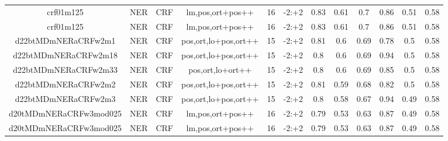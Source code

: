 \documentclass[a4paper]{article}
\begin{document}
\begin{landscape}
\begin{center}
\begin{tabular}{ |c|c|c|c|c|c|c|c|c|c|c|c|}
 	
 		
 		\small{ crf01m125 } & NER & CRF & lm,pos,ort+pos++  &  16 &  -2:+2  &  0.83 & 0.61 & 0.7  &  0.86 & 0.51 & 0.58 \\
 		

 	
 
 	
 		
 		\small{ crf01m125 } & NER & CRF & lm,pos,ort+pos++  &  16 &  -2:+2  &  0.83 & 0.61 & 0.7  &  0.86 & 0.51 & 0.58 \\
 		

 	
 
 	
 		
 		\small{ d22btMDmNERaCRFw2m1 } & NER & CRF & pos,ort,lo+pos,ort++  &  15 &  -2:+2  &  0.81 & 0.6 & 0.69  &  0.78 & 0.5 & 0.58 \\
 		

 	
 
 	
 		
 		\small{ d22btMDmNERaCRFw2m18 } & NER & CRF & pos,ort,lo+pos,ort++  &  15 &  -2:+2  &  0.8 & 0.6 & 0.69  &  0.94 & 0.5 & 0.58 \\
 		

 	
 
 	
 		
 		\small{ d22btMDmNERaCRFw2m33 } & NER & CRF & pos,ort,lo+ort++  &  15 &  -2:+2  &  0.8 & 0.6 & 0.69  &  0.85 & 0.5 & 0.58 \\
 		

 	
 
 	
 		
 		\small{ d22btMDmNERaCRFw2m2 } & NER & CRF & pos,ort,lo+pos,ort++  &  15 &  -2:+2  &  0.81 & 0.59 & 0.68  &  0.82 & 0.5 & 0.58 \\
 		

 	
 
 	
 		
 		\small{ d22btMDmNERaCRFw2m3 } & NER & CRF & pos,ort,lo+pos,ort++  &  15 &  -2:+2  &  0.8 & 0.58 & 0.67  &  0.94 & 0.49 & 0.58 \\
 		

 	
 
 	
 		
 		\small{ d20tMDmNERaCRFw3mod025 } & NER & CRF & lm,pos,ort+pos++  &  16 &  -2:+2  &  0.79 & 0.53 & 0.63  &  0.87 & 0.49 & 0.58 \\
 		

 	
 
 	
 		
 		\small{ d20tMDmNERaCRFw3mod025 } & NER & CRF & lm,pos,ort+pos++  &  16 &  -2:+2  &  0.79 & 0.53 & 0.63  &  0.87 & 0.49 & 0.58 \\
 		


\end{tabular}
\end{center}
\end{landscape}
\end{document}
